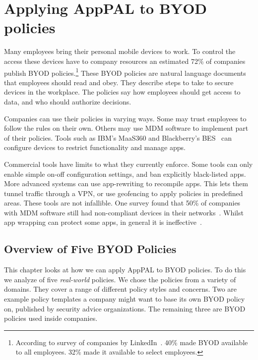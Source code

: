 \documentclass[thesis.tex]{subfiles}
\begin{document}
\chapter{Applying AppPAL to BYOD policies}
\label{chap:byod}

Many employees bring their personal mobile devices to work. To control
the access these devices have to company resources an estimated 72\%
of companies publish \ac{BYOD} policies.\footnote{According to survey
  of companies by LinkedIn~\cite{schulze_byod_2016}. 40\% made \ac{BYOD}
  available to all employees. 32\% made it available to select
  employees.} These \ac{BYOD} policies are natural language documents
that employees should read and obey. They describe steps to take to
secure devices in the workplace. The policies say how employees should
get access to data, and who should authorize decisions.

Companies can use their policies in varying ways. Some may
trust employees to follow the rules on their own. Others may use
\ac{MDM} software to implement part of their policies. Tools such as
IBM's MaaS360 and Blackberry's BES~\cite{ibm_ibm_nodate,blackberry_secure_nodate} can
configure devices to restrict functionality and manage apps.

Commercial tools have limits to what they currently enforce. Some
tools can only enable simple on-off configuration settings, and ban
explicitly black-listed apps. More advanced systems can use
app-rewriting to recompile apps. This lets them tunnel traffic through a VPN, or use
geofencing to apply policies in predefined areas. These tools are not
infallible. One survey found that 50\% of companies with \ac{MDM}
software still had non-compliant devices in their
networks~\cite{mobileiron_security_labs_q4_2015}. Whilst app wrapping
can protect some apps, in general it is
ineffective~\cite{hao_effectiveness_2013}.

\section{Overview of Five BYOD Policies}
\label{sec:overview-of-five-byod-policies}

This chapter looks at how we can apply AppPAL to
BYOD policies.  To do this we analyze of five \emph{real-world} policies.
We chose the policies from a variety of domains.  They cover a range
of different policy styles and concerns.  Two are example policy
templates a company might want to base its own BYOD policy on,
published by security advice organizations.  The remaining three are
BYOD policies used inside companies.
\end{document}
